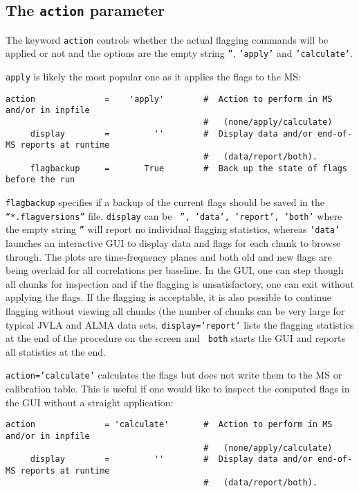 \subsection{The {\tt action} parameter}
\label{section:edit.flagdata.action}

The keyword {\tt action} controls whether the actual flagging
commands will be applied or not and the options are the empty string
{\tt ''}, {\tt 'apply'} and {\tt 'calculate'}.

{\tt apply} is likely the most popular one as it applies the flags to the MS:
\small
\begin{verbatim}
action              =    'apply'        #  Action to perform in MS and/or in inpfile
                                        #   (none/apply/calculate)
     display        =         ''        #  Display data and/or end-of-MS reports at runtime
                                        #   (data/report/both).
     flagbackup     =       True        #  Back up the state of flags before the run
\end{verbatim}
\normalsize

{\tt flagbackup} specifies if a backup of the current flags should be
saved in the {\tt ``*.flagversions''} file. {\tt display} can be {\tt
  '', 'data', 'report', 'both'} where the empty string {\tt ''} will
report no individual flagging statistics, whereas {\tt 'data'}
launches an interactive GUI to display data and flags for each chunk to
browse through. The plots are time-frequency planes and both old and
new flags are being overlaid for all correlations per baseline. In the
GUI, one can step though all chunks for inspection and if the flagging
is unsatisfactory, one can exit without applying the flags. If the
flagging is acceptable, it is also possible to continue flagging
without viewing all chunks (the number of chunks can be very large for
typical JVLA and ALMA data sets. {\tt display='report'} lists the
flagging statistics at the end of the procedure on the screen and {\tt
  both} starts the GUI and reports all statistics at the end.


{\tt action='calculate'} calculates the flags but does not write them
to the MS or calibration table. This is useful if one would like to
inspect the computed flags in the GUI without a straight application:

\small
\begin{verbatim}
action              = 'calculate'       #  Action to perform in MS and/or in inpfile
                                        #   (none/apply/calculate)
     display        =         ''        #  Display data and/or end-of-MS reports at runtime
                                        #   (data/report/both).
\end{verbatim}
\normalsize

